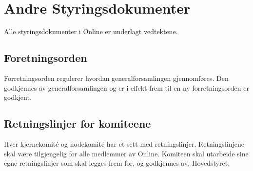 \chapter{Andre Styringsdokumenter}
\vspace{23pt}

Alle styringsdokumenter i Online er underlagt vedtektene.

\section{Foretningsorden}
\vspace{23pt}

Forretningsorden regulerer hvordan generalforsamlingen gjennomføres. Den godkjennes av generalforsamlingen og er i effekt frem til en ny forretningsorden er godkjent.

\section{Retningslinjer for komiteene}
\vspace{23pt}

Hver kjernekomité og nodekomité har et sett med retningslinjer. Retningslinjene skal være tilgjengelig for alle medlemmer av Online. Komiteen skal utarbeide sine egne retningslinjer som skal legges frem for, og godkjennes av, Hovedstyret.


